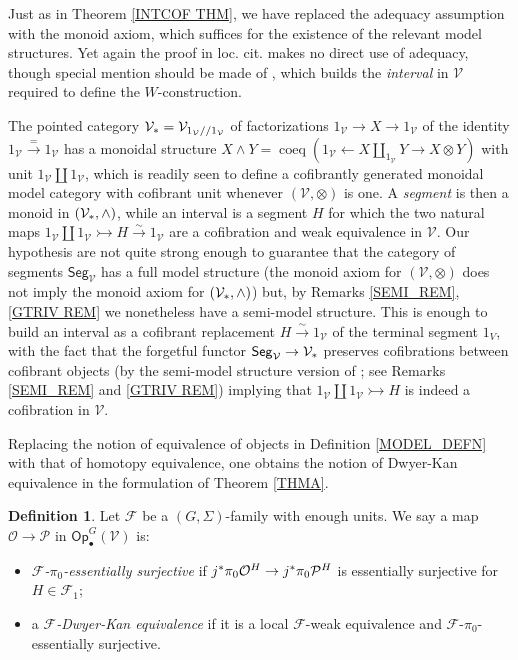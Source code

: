 \documentclass[a4paper,10pt
 ,final
]{article}%
\numberwithin{equation}{section}
\numberwithin{figure}{section}
\theoremstyle{definition} %
\newtheorem{definition}[equation]{Definition}%
\newcommand{\Op}{\mathsf{Op}}%
\newcommand{\F}{\ensuremath{\mathcal F}}
\newcommand{\V}{\ensuremath{\mathcal V}}
\renewcommand{\O}{\ensuremath{\mathcal O}}
\renewcommand{\P}{\ensuremath{\mathcal P}}
\newcommand{\1}{\ensuremath{\mathbbm 1}}%
\begin{document}
Just as in Theorem \ref{INTCOF THM},
we have replaced the adequacy assumption \cite[Def. 1.1]{BM13}
with the monoid axiom, which suffices for the existence of the relevant model structures. 
Yet again the proof in loc. cit. makes no direct use of adequacy, 
though special mention should be made of \cite[Lemma 2.23]{BM13}, 
which builds the \emph{interval} \cite[Def. 4.1]{BM06} in $\V$
required to define the $W$-construction.

The pointed category $\V_{\**}=\V_{1_{\V}//1_{\V}}$
of factorizations
$1_{\V} \to X \to 1_{\V}$
of the identity
$1_{\V} \xrightarrow{=} 1_{\V}$
has a monoidal structure
$X \wedge Y  = \mathop{\mathrm{coeq}} \left(1_{\V} \leftarrow X \amalg_{1_{\V}} Y \to X \otimes Y\right)$ with unit $1_{\V} \amalg 1_{\V}$,
which is readily seen to define a cofibrantly generated monoidal model category with cofibrant unit whenever $(\V,\otimes)$ is one.
A \emph{segment} \cite[Def. 4.1]{BM06} is then a monoid
in $(\V_{\**},\wedge)$,
while an interval is a segment $H$ for which the two natural maps
$1_{\V} \amalg 1_{\V} \rightarrowtail H \xrightarrow{\sim} 1_{\V}$
are a cofibration and weak equivalence in $\V$.
Our hypothesis are not quite strong enough 
to guarantee that the category of segments $\mathsf{Seg}_{\V}$
has a full model structure 
(the monoid axiom for $(\V,\otimes)$ does not imply the monoid axiom for $(\V_{\**},\wedge)$) but,
by Remarks \ref{SEMI_REM}, \ref{GTRIV REM}
we nonetheless have a semi-model structure. This is enough to build an interval as a cofibrant replacement
$H \xrightarrow{\sim} 1_{\V}$
of the terminal segment $1_{V}$, with the fact that the forgetful functor
$\mathsf{Seg}_{\V} \to \V_{\**}$
preserves cofibrations between cofibrant objects 
(by the semi-model structure version of \cite[Thm. \ref{OC-THMII}]{BP_FCOP};
see Remarks \ref{SEMI_REM} and \ref{GTRIV REM})
implying that
$1_{\V} \amalg 1_{\V} \rightarrowtail H$
is indeed a cofibration in $\V$.


\vskip 10pt



Replacing the notion of equivalence of objects
in Definition \ref{MODEL_DEFN}
with that of homotopy equivalence, 
one obtains the notion of Dwyer-Kan equivalence
in the formulation of Theorem \ref{THMA}.


\begin{definition}\label{DKEQUIV_DEF}
Let $\F$ be a $(G,\Sigma)$-family with enough units.
We say a map $\O \to \P$ in $\Op^G_\bullet(\V)$ is:
\begin{itemize}
\item \textit{$\F$-$\pi_0$-essentially surjective} if
	$j^{\**}\pi_0 \O^H \to j^{\**}\pi_0 \P^H$
	is essentially surjective for $H \in \F_1$;
\item a \textit{$\F$-Dwyer-Kan equivalence} if
	it is a local $\F$-weak equivalence and $\F$-$\pi_0$-essentially
	surjective.
\end{itemize}
\end{definition}
\end{document}
